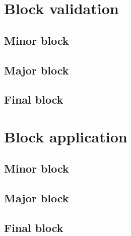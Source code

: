 \documentclass[../hydrozoa.tex]{subfiles}
\begin{document}


\section{Block validation}%
\label{h:l2-block-validation}%


\subsection{Minor block}%
\label{h:l2-block-validation-minor}%


\subsection{Major block}%
\label{h:l2-block-validation-major}%


\subsection{Final block}%
\label{h:l2-block-validation-final}%


\section{Block application}%
\label{h:l2-block-application}%


\subsection{Minor block}%
\label{h:l2-block-application-minor}%


\subsection{Major block}%
\label{h:l2-block-application-major}%


\subsection{Final block}%
\label{h:l2-block-application-final}%

\end{document}
